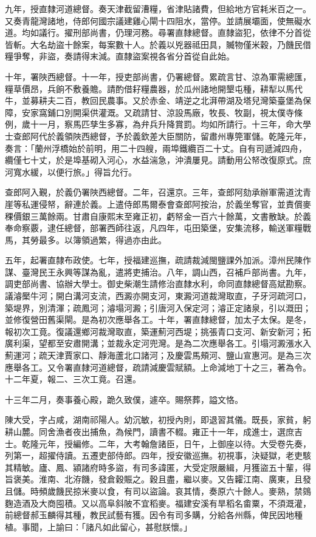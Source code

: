 \begin{pinyinscope}
九年，授直隸河道總督。奏天津截留漕糧，省津貼諸費，但給地方官耗米百之一。又奏青龍灣諸地，侍郎何國宗議建雞心閘十四阻水，當停。並請展壩面，使無礙水道。均如議行。擢刑部尚書，仍理河務。尋署直隸總督。直隸盜犯，依律不分首從皆斬。大名劫盜十餘案，每案數十人。於義以兇器祗田具，贓物僅米穀，乃饑民借糧爭奪，非盜，奏請得末減。直隸盜案視各省分首從自此始。

十年，署陜西總督。十一年，授吏部尚書，仍署總督。累疏言甘、涼為軍需總匯，糧草價昂，兵餉不敷養贍。請酌借耔糧農器，於瓜州諸地開墾屯種，耕犁以馬代牛，並募耕夫二百，教回民農事。又於赤金、靖逆之北湃帶湖及塔兒灣築臺堡為保障，安家窩鋪口別開渠供灌溉。又疏請甘、涼設馬廠，牧長、牧副，視太僕寺條例，歲十一月，察馬匹孳生多寡，為弁兵升降賞罰。均如所請行。十三年，命大學士查郎阿代於義領陜西總督，予於義欽差大臣關防，留肅州專筦軍儲。乾隆元年，奏言：「蘭州浮橋始於前明，用二十四艘，兩埠鐵纜百二十丈。自有司遞減四舟，纜僅七十丈，於是埠基砌入河心，水益湍急，沖潰屢見。請動用公帑改復原式。庶河寬水緩，以便行旅。」得旨允行。

查郎阿入覲，於義仍署陜西總督。二年，召還京。三年，查郎阿劾承辦軍需道沈青崖等私運侵帑，辭連於義。上遣侍郎馬爾泰會查郎阿按治，於義坐奪官，並責償麥稞價銀三萬餘兩。甘肅自康熙末至雍正初，虧帑金一百六十餘萬，文書散缺。於義奉命察覈，逮任總督，部署西師往返，凡四年，屯田築堡，安集流移，輸送軍糧戰馬，其勞最多。以簿領過繁，得過亦由此。

五年，起署直隸布政使。七年，授福建巡撫，疏請裁減閩鹽課外加派。漳州民陳作謀、臺灣民王永興等謀為亂，遣將吏捕治。八年，調山西，召補戶部尚書。九年，調吏部尚書、協辦大學士。御史柴潮生請修治直隸水利，命同直隸總督高斌勘察。議濬檿牛河；開白溝河支流，西澱亦開支河，東澱河道裁灣取直，子牙河疏河口，築堤界，別清渾；疏鳳河；濬塌河澱；引唐河入保定河；濬正定諸泉，引以溉田；並修復營田舊渠閘。是為初次應舉各工。十年，署直隸總督，加太子太保。是冬，報初次工竟。復議還鄉河裁灣取直，築運薊河西堤；挑張青口支河、新安新河；拓廣利渠，望都至安肅開溝；並裁永定河兜灣。是為二次應舉各工。引塌河澱漲水入薊運河；疏天津賈家口、靜海蘆北口諸河；及慶雲馬頰河、鹽山宣惠河。是為三次應舉各工。又令署直隸河道總督，疏請減慶雲賦額。上命減地丁十之三，著為令。十二年夏，報二、三次工竟。召還。

十三年二月，奏事養心殿，跪久致僕，遽卒。賜祭葬，謚文恪。

陳大受，字占咸，湖南祁陽人。幼沉敏，初授內則，即退習其儀。既長，家貧，躬耕山麓。同舍漁者夜出捕魚，為候門，讀書不輟。雍正十一年，成進士，選庶吉士。乾隆元年，授編修。二年，大考翰詹諸臣，日午，上御座以待。大受卷先奏，列第一，超擢侍讀。五遷吏部侍郎。四年，授安徽巡撫。初視事，決疑獄，老吏駭其精敏。廬、鳳、潁諸府時多盜，有司多諱匿，大受定限嚴緝，月獲盜五十輩，得旨褒美。淮南、北洊饑，發倉穀賑之。穀且盡，繼以麥。又告糶江南、廣東，且發且儲。時頻歲饑民掠米麥以食，有司以盜論。哀其情，奏原六十餘人。麥熟，禁鵕麴造酒及大商囤積。又以高阜斜陂不宜稻麥。福建安溪有旱稻名畬粟，不須溉灌，前總督郝玉麟得其種，教民試藝有獲。因令有司多購，分給各州縣，俾民因地種植。事聞，上諭曰：「諸凡如此留心，甚慰朕懷。」


\end{pinyinscope}
